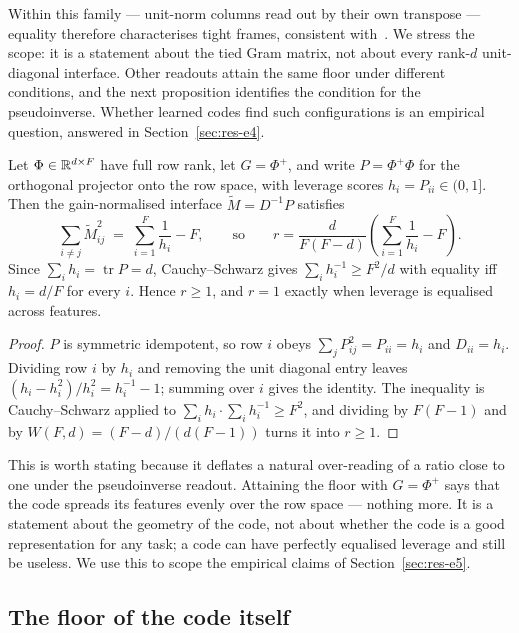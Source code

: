 Within this family --- unit-norm columns read out by their own transpose --- equality therefore
characterises tight frames, consistent
with~\cite{waldron2003generalized,datta2012geometry}. We stress the scope: it is a statement
about the tied Gram matrix, not about every rank-$d$ unit-diagonal interface. Other readouts
attain the same floor under different conditions, and the next proposition identifies the
condition for the pseudoinverse. Whether learned codes find such configurations is an empirical
question, answered in Section~\ref{sec:res-e4}.

\begin{proposition}
\label{prop:leverage}
Let $\Phi\in\mathbb{R}^{d\times F}$ have full row rank, let $G=\Phi^{+}$, and write
$P=\Phi^{+}\Phi$ for the orthogonal projector onto the row space, with leverage scores
$h_i=P_{ii}\in(0,1]$. Then the gain-normalised interface $\widetilde M=D^{-1}P$ satisfies
\[
  \sum_{i\neq j}\widetilde M_{ij}^{2}\;=\;\sum_{i=1}^{F}\frac1{h_i}-F ,
  \qquad\text{so}\qquad
  r=\frac{d}{F(F-d)}\left(\sum_{i=1}^{F}\frac1{h_i}-F\right).
\]
Since $\sum_i h_i=\operatorname{tr}P=d$, Cauchy--Schwarz gives $\sum_i h_i^{-1}\ge F^2/d$ with
equality iff $h_i=d/F$ for every $i$. Hence $r\ge1$, and $r=1$ exactly when leverage is
equalised across features.
\end{proposition}

\begin{proof}
$P$ is symmetric idempotent, so row $i$ obeys $\sum_j P_{ij}^2=P_{ii}=h_i$ and $D_{ii}=h_i$.
Dividing row $i$ by $h_i$ and removing the unit diagonal entry leaves
$(h_i-h_i^2)/h_i^2=h_i^{-1}-1$; summing over $i$ gives the identity. The inequality is
Cauchy--Schwarz applied to $\sum_i h_i\cdot\sum_i h_i^{-1}\ge F^2$, and dividing by $F(F-1)$
and by $W(F,d)=(F-d)/(d(F-1))$ turns it into $r\ge1$.
\end{proof}

This is worth stating because it deflates a natural over-reading of a ratio close to one under
the pseudoinverse readout. Attaining the floor with $G=\Phi^{+}$ says that the code spreads its
features evenly over the row space --- nothing more. It is a statement about the geometry of the
code, not about whether the code is a good representation for any task; a code can have
perfectly equalised leverage and still be useless. We use this to scope the empirical claims of
Section~\ref{sec:res-e5}.

\subsection{The floor of the code itself}
\label{sec:codefloor}

